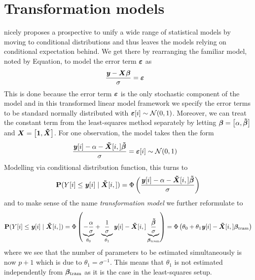 \documentclass[11pt,a4paper,twoside]{book}\usepackage[]{graphicx}\usepackage[]{xcolor}
\begin{document}
\newpage
\section{Transformation models}\label{sec:trans_model}

\cite{Hothorn2020} nicely proposes a prospective to unify a wide range of statistical models by moving to conditional distributions and thus leaves the models relying on conditional expectation behind. We get there by rearranging the familiar model, noted by Equation, to model the error term ${\boldsymbol{\varepsilon}}$ as
\begin{align*}
\frac{{\textbf{\textit{y}}}-\boldsymbol{X\beta}}{\sigma}&=\boldsymbol{\varepsilon}
\end{align*}
This is done because the error term ${\boldsymbol{\varepsilon}}$ is the only stochastic component of the model and in this transformed linear model framework we specify the error terms to be standard normally distributed with ${\boldsymbol{\varepsilon}}[i]\sim\operatorname{\mathcal{N}}(0,1)$. Moreover, we can treat the constant term from the least-squares method separately by letting ${\boldsymbol{\beta}}=\left[\alpha,\boldsymbol{\tilde{\beta}}\right]$ and ${\boldsymbol{X}}=\left[\boldsymbol{1},\boldsymbol{\tilde{X}}\right]$. For one observation, the model takes then the form
\begin{align*}
\frac{{\textbf{\textit{y}}}[i]-\alpha -\boldsymbol{\tilde X}[i,]\boldsymbol{\tilde\beta}}{\sigma}&={\boldsymbol{\varepsilon}}[i]\sim \operatorname{\mathcal{N}}(0,1)
\end{align*}
Modelling via conditional distribution function, this turns to
\begin{align}
{\mathbf{P}}(Y[i]\leq {\textbf{\textit{y}}}[i]\mid\boldsymbol{\tilde X}[i,])=\Phi\left(\frac{{\textbf{\textit{y}}}[i]-\alpha-\boldsymbol{\tilde X}[i,]\boldsymbol{\tilde{\beta}} }{\sigma}\right) \label{eq:lspara}
\end{align}
and to make sense of the name \textit{transformation model} we further reformulate to
\begin{align}
{\mathbf{P}}(Y[i]\leq {\textbf{\textit{y}}}[i]\mid\boldsymbol{\tilde X}[i,])=\Phi\left(\underbrace{-\frac{\alpha}{\sigma}}_{\theta_0}+\underbrace{\frac{1}{\sigma}}_{\theta_1}{\textbf{\textit{y}}}[i]-\boldsymbol{\tilde X}[i,]\underbrace{\frac{\boldsymbol{\tilde\beta}}{\sigma}}_{\boldsymbol{\beta_{\text{tram}}}}\right)=\Phi\left(\theta_0+\theta_1 {\textbf{\textit{y}}}[i]-\boldsymbol{\tilde X}[i,]\boldsymbol{\beta_{\text{tram}}} \right) \label{eq:ll_trans}
\end{align}
where we see that the number of parameters to be estimated simultaneously  is now $p+1$ which is due to $\theta_1=\sigma^{-1}$. This means that $\theta_1$ is not estimated independently from $\boldsymbol{\beta_{\text{tram}}}$ as it is the case in the least-squares setup.
\end{document}
